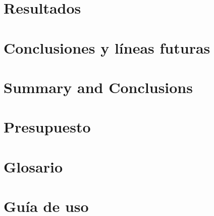 \documentclass[spanish,a4paper,14pt,oneside]{extreport}
\begin{document}
\chapter{Resultados}
\label{chapter:tres}



\newpage{\pagestyle{empty}}
\thispagestyle{empty}

\chapter{Conclusiones y líneas futuras}
\label{chapter:Conclusiones}



\newpage{\pagestyle{empty}}
\thispagestyle{empty}

\chapter{Summary and Conclusions }
\label{chapter:ingles}



\newpage{\pagestyle{empty}}
\thispagestyle{empty}

\chapter{Presupuesto}
\label{chapter:presupuesto}



\newpage{\pagestyle{empty}}
\thispagestyle{empty}
\begin{appendix}

\chapter{Glosario}
\label{appendix:1}


\chapter{Guía de uso}
\label{appendix:2}


\end{appendix}

\clearpage
{}

\printindex



\nocite{*}

\end{document}
